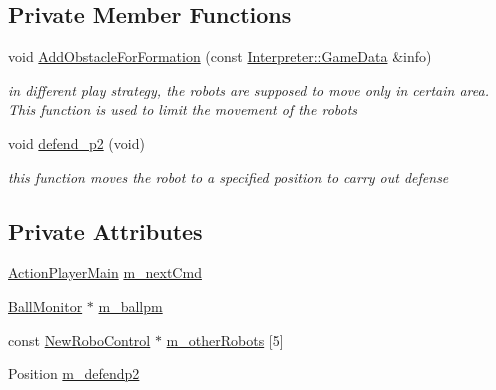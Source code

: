 \subsection*{Private Member Functions}
\begin{DoxyCompactItemize}
\item 
void \hyperlink{classPlayerMain_a978b3ce16f5d8e5d1cb9ef70f387227e}{AddObstacleForFormation} (const \hyperlink{structInterpreter_1_1GameData}{Interpreter::GameData} \&info)
\begin{DoxyCompactList}\small\item\em in different play strategy, the robots are supposed to move only in certain area. This function is used to limit the movement of the robots \item\end{DoxyCompactList}\item 
void \hyperlink{classPlayerMain_a64e1d5734e07cfa82b2571aa11bb4f9d}{defend\_\-p2} (void)
\begin{DoxyCompactList}\small\item\em this function moves the robot to a specified position to carry out defense \item\end{DoxyCompactList}\end{DoxyCompactItemize}
\subsection*{Private Attributes}
\begin{DoxyCompactItemize}
\item 
\hyperlink{classPlayerMain_af07f952a547b2902a452c1413f26dae2}{ActionPlayerMain} \hyperlink{classPlayerMain_a038f8616ec79dd26bae8039b6ada8321}{m\_\-nextCmd}
\item 
\hyperlink{classBallMonitor}{BallMonitor} $\ast$ \hyperlink{classPlayerMain_aea071084f1a844ceafac3621ffb5c320}{m\_\-ballpm}
\item 
const \hyperlink{classNewRoboControl}{NewRoboControl} $\ast$ \hyperlink{classPlayerMain_a020813a869e52dc7368ba9216b10e3d8}{m\_\-otherRobots} \mbox{[}5\mbox{]}
\item 
Position \hyperlink{classPlayerMain_a859b462c123135acc3ad88b092429611}{m\_\-defendp2}
\end{DoxyCompactItemize}


